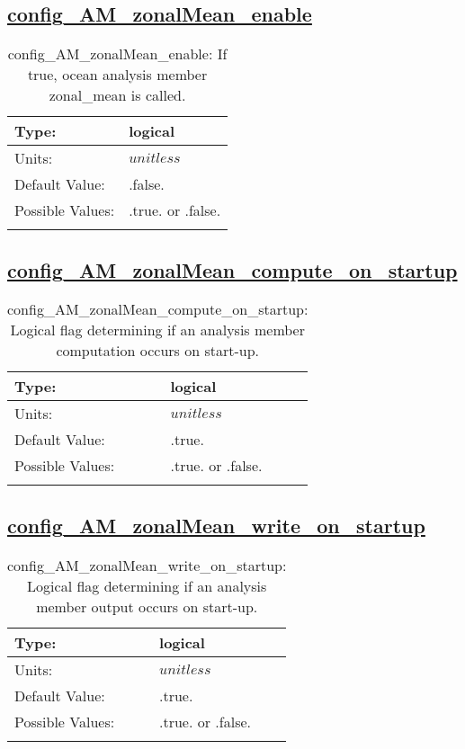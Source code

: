 \subsection[config\_AM\_zonalMean\_enable]{\hyperref[sec:nm_tab_AM_zonalMean]{config\_AM\_zonalMean\_enable}}
\label{subsec:nm_sec_config_AM_zonalMean_enable}
\begin{center}
\begin{longtable}{| p{2.0in} || p{4.0in} |}
    \hline
    Type: & logical \\
    \hline
    Units: & $unitless$ \\
    \hline
    Default Value: & .false. \\
    \hline
    Possible Values: & .true. or .false. \\
    \hline
    \caption{config\_AM\_zonalMean\_enable: If true, ocean analysis member zonal\_mean is called.}
\end{longtable}
\end{center}
\subsection[config\_AM\_zonalMean\_compute\_on\_startup]{\hyperref[sec:nm_tab_AM_zonalMean]{config\_AM\_zonalMean\_compute\_on\_startup}}
\label{subsec:nm_sec_config_AM_zonalMean_compute_on_startup}
\begin{center}
\begin{longtable}{| p{2.0in} || p{4.0in} |}
    \hline
    Type: & logical \\
    \hline
    Units: & $unitless$ \\
    \hline
    Default Value: & .true. \\
    \hline
    Possible Values: & .true. or .false. \\
    \hline
    \caption{config\_AM\_zonalMean\_compute\_on\_startup: Logical flag determining if an analysis member computation occurs on start-up.}
\end{longtable}
\end{center}
\subsection[config\_AM\_zonalMean\_write\_on\_startup]{\hyperref[sec:nm_tab_AM_zonalMean]{config\_AM\_zonalMean\_write\_on\_startup}}
\label{subsec:nm_sec_config_AM_zonalMean_write_on_startup}
\begin{center}
\begin{longtable}{| p{2.0in} || p{4.0in} |}
    \hline
    Type: & logical \\
    \hline
    Units: & $unitless$ \\
    \hline
    Default Value: & .true. \\
    \hline
    Possible Values: & .true. or .false. \\
    \hline
    \caption{config\_AM\_zonalMean\_write\_on\_startup: Logical flag determining if an analysis member output occurs on start-up.}
\end{longtable}
\end{center}
